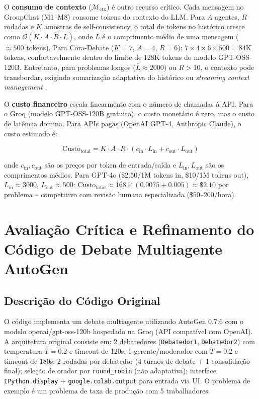 \documentclass[5p]{elsarticle}
\theoremstyle{remark}
\begin{document}
O \textbf{consumo de contexto} ($\mathcal{M}_{\text{ctx}}$) é outro recurso crítico. Cada mensagem no GroupChat (M1--M8) consome tokens do contexto do LLM. Para $A$ agentes, $R$ rodadas e $K$ amostras de self-consistency, o total de tokens no histórico cresce como $\mathcal{O}(K \cdot A \cdot R \cdot \bar{L})$, onde $\bar{L}$ é o comprimento médio de uma mensagem ($\approx 500$ tokens). Para Cora-Debate ($K{=}7$, $A{=}4$, $R{=}6$): $7 \times 4 \times 6 \times 500 = 84\text{K}$ tokens, confortavelmente dentro do limite de 128K tokens do modelo GPT-OSS-120B. Entretanto, para problemas longos ($\bar{L} \approx 2000$) ou $R > 10$, o contexto pode transbordar, exigindo sumarização adaptativa do histórico ou \textit{streaming context management} \cite{Liu2024Decoding}.

O \textbf{custo financeiro} escala linearmente com o número de chamadas à API. Para o Groq (modelo GPT-OSS-120B gratuito), o custo monetário é zero, mas o custo de latência domina. Para APIs pagas (OpenAI GPT-4, Anthropic Claude), o custo estimado é:

\begin{equation}
\text{Custo}_{\text{total}} = K \cdot A \cdot R \cdot (c_{\text{in}} \cdot L_{\text{in}} + c_{\text{out}} \cdot L_{\text{out}})
\label{eq:custo}
\end{equation}

onde $c_{\text{in}}, c_{\text{out}}$ são os preços por token de entrada/saída e $L_{\text{in}}, L_{\text{out}}$ são os comprimentos médios. Para GPT-4o (\$2.50/1M tokens in, \$10/1M tokens out), $L_{\text{in}} \approx 3000$, $L_{\text{out}} \approx 500$: $\text{Custo}_{\text{total}} \approx 168 \times (0.0075 + 0.005) \approx \$2.10$ por problema -- competitivo com revisão humana especializada (\$50--200/hora).

\section{Avaliação Crítica e Refinamento do Código de Debate Multiagente AutoGen}

\subsection{Descrição do Código Original}

O código implementa um debate multiagente utilizando AutoGen 0.7.6 com o modelo openai/gpt-oss-120b hospedado na Groq (API compatível com OpenAI). A arquitetura original consiste em: 2 debatedores (\texttt{Debatedor1}, \texttt{Debatedor2}) com temperatura $T=0.2$ e timeout de 120s; 1 gerente/moderador com $T=0.2$ e timeout de 180s; 2 rodadas por debatedor (4 turnos de debate + 1 consolidação final); seleção de orador por \texttt{round\_robin} (não adaptativa); interface \texttt{IPython.display} + \texttt{google.colab.output} para entrada via UI. O problema de exemplo é um problema de taxa de produção com 5 trabalhadores.
\end{document}
